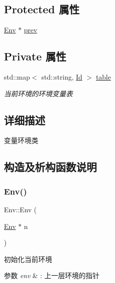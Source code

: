 \subsection*{Protected 属性}
\begin{DoxyCompactItemize}
\item 
\hyperlink{class_env}{Env} $\ast$ \hyperlink{class_env_a79a41e9166e949e4c1320ffe3750cb29}{prev}
\end{DoxyCompactItemize}
\subsection*{Private 属性}
\begin{DoxyCompactItemize}
\item 
\mbox{\label{class_env_ab93397b135a614cb1c7e6057a00a8d85}} 
std\+::map$<$ std\+::string, \hyperlink{class_id}{Id} $>$ \hyperlink{class_env_ab93397b135a614cb1c7e6057a00a8d85}{table}
\begin{DoxyCompactList}\small\item\em 当前环境的环境变量表 \end{DoxyCompactList}\end{DoxyCompactItemize}


\subsection{详细描述}
变量环境类 

\subsection{构造及析构函数说明}
\mbox{\label{class_env_ab9d20c5b47453e30038f156cc5e25c0f}} 
\subsubsection{\texorpdfstring{Env()}{Env()}}
{\footnotesize\ttfamily Env\+::\+Env (\begin{DoxyParamCaption}\item[{\hyperlink{class_env}{Env} $\ast$}]{n }\end{DoxyParamCaption})}



初始化当前环境 


\begin{DoxyParams}{参数}
{\em env} & \+: 上一层环境的指针 \\
\hline
\end{DoxyParams}


